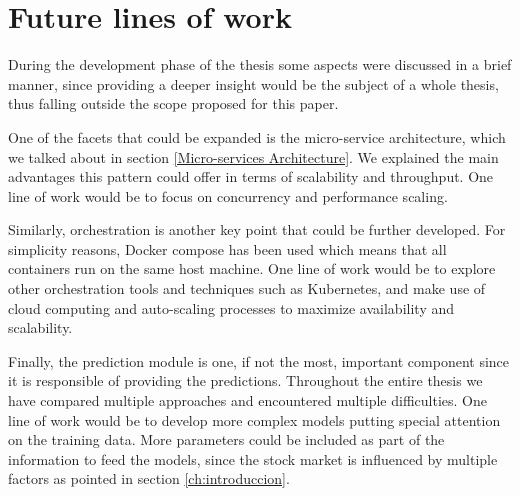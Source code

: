 \chapter{Future lines of work}
\label{fu:future}

During the development phase of the thesis some aspects were discussed in a brief manner, since providing a deeper insight would be the subject of a whole thesis, thus falling outside the scope proposed for this paper.

One of the facets that could be expanded is the micro-service architecture, which we talked about in section \ref{Micro-services Architecture}. We explained the main advantages this pattern could offer in terms of scalability and throughput. One line of work would be to focus on concurrency and performance scaling.

Similarly, orchestration is another key point that could be further developed. For simplicity reasons, Docker compose has been used which means that all containers run on the same host machine. One line of work would be to explore other orchestration tools and techniques such as Kubernetes, and make use of cloud computing and auto-scaling processes to maximize availability and scalability.

Finally, the prediction module is one, if not the most, important component since it is responsible of providing the predictions. Throughout the entire thesis we have compared multiple approaches and encountered multiple difficulties. One line of work would be to develop more complex models putting special attention on the training data. More parameters could be included as part of the information to feed the models, since the stock market is influenced by multiple factors as pointed in section \ref{ch:introduccion}. 

